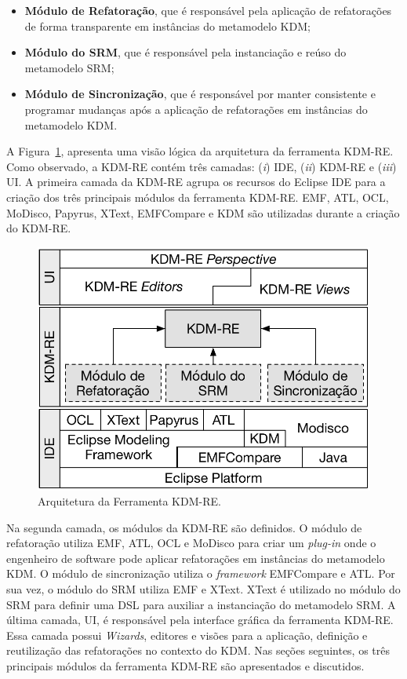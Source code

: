 \begin{itemize}
\item \textbf{Módulo de Refatoração}, que é responsável pela aplicação de refatorações de forma transparente em instâncias do metamodelo KDM;

\item \textbf{Módulo do SRM}, que é responsável pela instanciação e reúso do metamodelo SRM;

\item \textbf{Módulo de Sincronização}, que é responsável por manter consistente e programar mudanças após a aplicação de refatorações em instâncias do metamodelo KDM.

\end{itemize}

A Figura~\ref{fig:arquitetura_ferramenta_kdm_re}, apresenta uma visão lógica da arquitetura da ferramenta KDM-RE. Como observado, a KDM-RE contém três camadas: (\textit{i}) IDE, (\textit{ii}) KDM-RE e (\textit{iii}) UI. A primeira camada da KDM-RE agrupa os recursos do Eclipse IDE para a criação dos três principais módulos da ferramenta KDM-RE. EMF, ATL, OCL, MoDisco, Papyrus, XText, EMFCompare e KDM são utilizadas durante a criação do KDM-RE.

\begin{figure}[h]
	\centering
	\caption{Arquitetura da Ferramenta KDM-RE.}
	\label{fig:arquitetura_ferramenta_kdm_re}
	\includegraphics[scale=0.75]{images/arquitetura_KDM-RE}
	\fautor
\end{figure}

Na segunda camada, os módulos da KDM-RE são definidos. O módulo de refatoração utiliza EMF, ATL, OCL e MoDisco para criar um \textit{plug-in} onde o engenheiro de software pode aplicar refatorações em instâncias do metamodelo KDM. O módulo de sincronização utiliza o \textit{framework} EMFCompare e ATL. Por sua vez, o módulo do SRM utiliza EMF e XText. XText é utilizado no módulo do SRM para definir uma DSL para auxiliar a instanciação do metamodelo SRM. A última camada, UI, é responsável pela interface gráfica da ferramenta KDM-RE. Essa camada possui \textit{Wizards}, editores e visões para a aplicação, definição e reutilização das refatorações no contexto do KDM. Nas seções seguintes, os três principais módulos da ferramenta KDM-RE são apresentados e discutidos.


